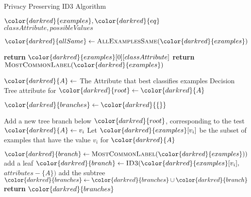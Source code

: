 \begin{algorithm}[t]
\caption{Privacy Preserving ID3 Algorithm }\label{a:id3-pp}
\begin{algorithmic}[1]
\renewcommand{\algorithmicrequire}{\textbf{Private Vars:}}
\Require ${\color{darkred}{examples}}, {\color{darkred}{eq}}$
\renewcommand{\algorithmicrequire}{\textbf{Global Vars:}}
\Require $classAttribute, possibleValues$

    \State ${\color{darkred}{allSame}} \gets \textsc{AllExamplesSame}({\color{darkred}{examples}})$

        \State \textbf{return} ${\color{darkred}{examples}}[0][classAttribute]$
        \State \textbf{return} $\textsc{MostCommonLabel}({\color{darkred}{examples}})$
    \EndIf

    \State ${\color{darkred}{A}} \gets$ The Attribute that best classifies examples
    \State Decision Tree attribute for ${\color{darkred}{root}} \gets {\color{darkred}{A}}$

    \State ${\color{darkred}{branches}} \gets {\color{darkred}{\{\}}}$

        \State Add a new tree branch below ${\color{darkred}{root}}$, corresponding to the test ${\color{darkred}{A}} \gets v_i$
        \State Let ${\color{darkred}{examples}}[v_i]$ be the subset of examples that have the value $v_i$ for ${\color{darkred}{A}}$

            \State ${\color{darkred}{branch}} \gets \textsc{MostCommonLabel}({\color{darkred}{examples}}))$ add a leaf
        \Else
            \State ${\color{darkred}{branch}} \gets \textsc{ID3}({\color{darkred}{examples}}[v_i],$ $attributes - \{A\})$ add the subtree
        \EndIf
        \State ${\color{darkred}{branches}} \gets {\color{darkred}{branches}} \cup {\color{darkred}{branch}}$
    \EndFor
    \State \textbf{return} ${\color{darkred}{branches}}$

\EndProcedure

\end{algorithmic}
\end{algorithm}

